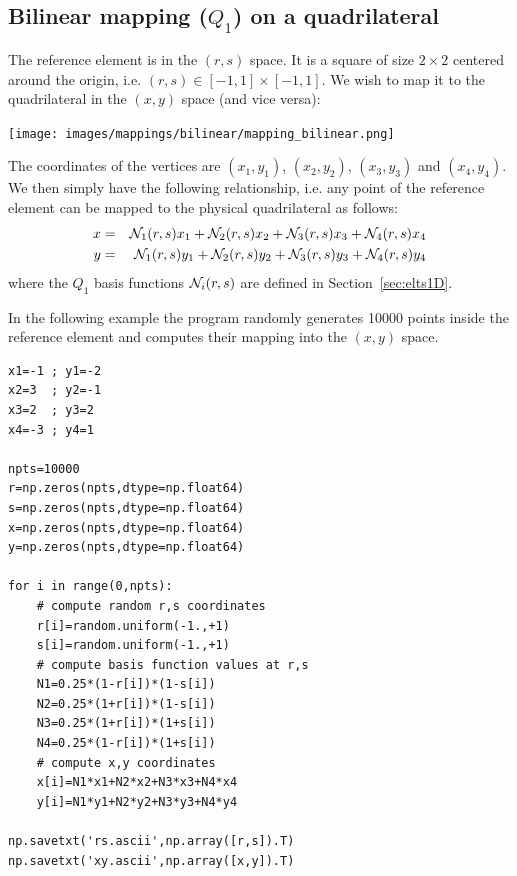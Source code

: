 \subsection{Bilinear mapping ($Q_1$) on a quadrilateral}

The  reference element 
is in the $(r,s)$ space. It is a square of size $2\times2$ 
centered around the origin, i.e. $(r,s)\in[-1,1]\times[-1,1]$. 
We wish to map it to the quadrilateral in the $(x,y)$ space 
(and vice versa):

\begin{center}
\texttt{[image: images/mappings/bilinear/mapping\_bilinear.png]}
\end{center}

The coordinates of the vertices are 
$(x_1,y_1)$, $(x_2,y_2)$, $(x_3,y_3)$ and $(x_4,y_4)$.
We then simply have the 
following relationship, i.e. any point of the reference element 
can be mapped to the physical quadrilateral as follows:
\begin{eqnarray}
x&=& {\mathcal{N}}_1(r,s) x_1 + {\mathcal{N}}_2(r,s) x_2 + {\mathcal{N}}_3(r,s) x_3 + {\mathcal{N}}_4(r,s) x_4 \\
y&=& {\mathcal{N}}_1(r,s) y_1 + {\mathcal{N}}_2(r,s) y_2 + {\mathcal{N}}_3(r,s) y_3 + {\mathcal{N}}_4(r,s) y_4 \label{mapppQ1a} 
\end{eqnarray} 
where the $Q_1$ basis functions ${\mathcal{N}}_i(r,s)$ are defined in Section~\ref{sec:elts1D}.

In the following example the program randomly generates 10000 points 
inside the reference 
element and computes their mapping into the $(x,y)$ space. 

\begin{lstlisting}
x1=-1 ; y1=-2
x2=3  ; y2=-1
x3=2  ; y3=2
x4=-3 ; y4=1

npts=10000
r=np.zeros(npts,dtype=np.float64)   
s=np.zeros(npts,dtype=np.float64)   
x=np.zeros(npts,dtype=np.float64)   
y=np.zeros(npts,dtype=np.float64)   

for i in range(0,npts):
    # compute random r,s coordinates
    r[i]=random.uniform(-1.,+1)
    s[i]=random.uniform(-1.,+1)
    # compute basis function values at r,s
    N1=0.25*(1-r[i])*(1-s[i])
    N2=0.25*(1+r[i])*(1-s[i])
    N3=0.25*(1+r[i])*(1+s[i])
    N4=0.25*(1-r[i])*(1+s[i])
    # compute x,y coordinates
    x[i]=N1*x1+N2*x2+N3*x3+N4*x4
    y[i]=N1*y1+N2*y2+N3*y3+N4*y4

np.savetxt('rs.ascii',np.array([r,s]).T)
np.savetxt('xy.ascii',np.array([x,y]).T)
\end{lstlisting}

